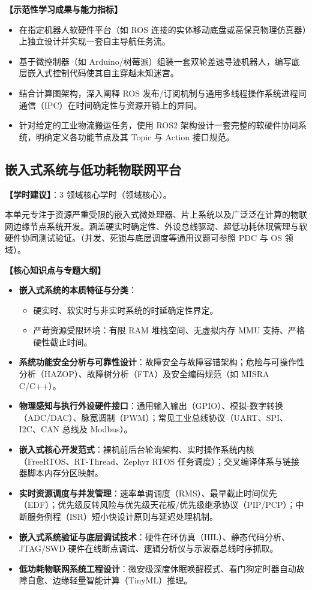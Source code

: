 \textbf{【示范性学习成果与能力指标】}
\begin{itemize}
    \item 在指定机器人软硬件平台（如 ROS 连接的实体移动底盘或高保真物理仿真器）上独立设计并实现一套自主导航任务流。
    \item 基于微控制器（如 Arduino/树莓派）组装一套双轮差速寻迹机器人，编写底层嵌入式控制代码使其自主穿越未知迷宫。
    \item 结合计算图架构，深入阐释 ROS 发布/订阅机制与通用多线程操作系统进程间通信（IPC）在时间确定性与资源开销上的异同。
    \item 针对给定的工业物流搬运任务，使用 ROS2 架构设计一套完整的软硬件协同系统，明确定义各功能节点及其 Topic 与 Action 接口规范。
\end{itemize}

\subsection{嵌入式系统与低功耗物联网平台}
\textbf{【学时建议】}：3 领域核心学时（领域核心）。

本单元专注于资源严重受限的嵌入式微处理器、片上系统以及广泛泛在计算的物联网边缘节点系统开发。涵盖硬实时确定性、外设总线驱动、超低功耗休眠管理与软硬件协同测试验证。（并发、死锁与底层调度等通用议题可参照 PDC 与 OS 领域）。

\textbf{【核心知识点与专题大纲】}
\begin{itemize}
    \item \textbf{嵌入式系统的本质特征与分类}：
    \begin{itemize}
        \item 硬实时、软实时与非实时系统的时延确定性界定。
        \item 严苛资源受限环境：有限 RAM 堆栈空间、无虚拟内存 MMU 支持、严格硬性截止时间。
    \end{itemize}
    \item \textbf{系统功能安全分析与可靠性设计}：故障安全与故障容错架构；危险与可操作性分析（HAZOP）、故障树分析（FTA）及安全编码规范（如 MISRA C/C++）。
    \item \textbf{物理感知与执行外设硬件接口}：通用输入输出（GPIO）、模拟-数字转换（ADC/DAC）、脉宽调制（PWM）；常见工业总线协议（UART、SPI、I2C、CAN 总线及 Modbus）。
    \item \textbf{嵌入式核心开发范式}：裸机前后台轮询架构、实时操作系统内核（FreeRTOS、RT-Thread、Zephyr RTOS 任务调度）；交叉编译体系与链接器脚本内存分区映射。
    \item \textbf{实时资源调度与并发管理}：速率单调调度（RMS）、最早截止时间优先（EDF）；优先级反转风险与优先级天花板/优先级继承协议（PIP/PCP）；中断服务例程（ISR）短小快设计原则与延迟处理机制。
    \item \textbf{嵌入式系统验证与底层调试技术}：硬件在环仿真（HIL）、静态代码分析、JTAG/SWD 硬件在线断点调试、逻辑分析仪与示波器总线时序抓取。
    \item \textbf{低功耗物联网系统工程设计}：微安级深度休眠唤醒模式、看门狗定时器自动故障自愈、边缘轻量智能计算（TinyML）推理。
\end{itemize}

